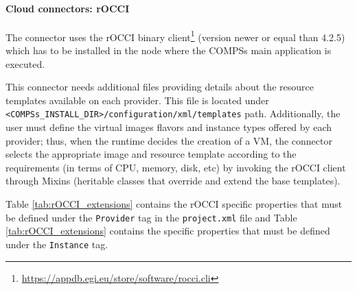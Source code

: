 \paragraph{Cloud connectors: rOCCI}
The connector uses the rOCCI binary client\footnote{\url{https://appdb.egi.eu/store/software/rocci.cli}}
(version newer or equal than 4.2.5) which has to be installed in the node where the COMPSs main
application is executed.

This connector needs additional files providing details about the resource templates available on
each provider. This file is located under \\ \texttt{<COMPSs\_INSTALL\_DIR>/configuration/xml/templates} path. Additionally, the user must define the virtual images flavors and instance types offered by each provider;
thus, when the runtime decides the creation of a VM, the connector selects the appropriate image and
resource template according to the requirements (in terms of CPU, memory, disk, etc) by invoking the
rOCCI client through Mixins (heritable classes that override and extend the base templates).

Table \ref{tab:rOCCI_extensions} contains the rOCCI specific properties that must be defined under the \texttt{Provider} tag in
the \texttt{project.xml} file and Table \ref{tab:rOCCI_extensions} contains the specific properties that must be defined
under the \texttt{Instance} tag.

